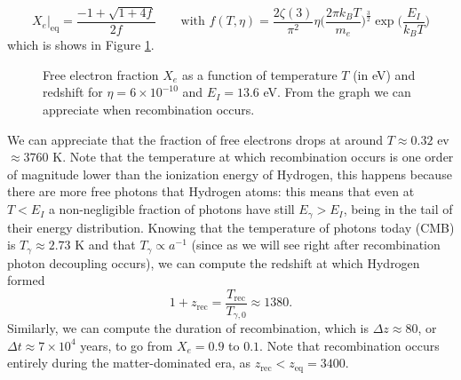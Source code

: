 $$
X_e\bigg|_\text{eq}=\frac{-1+\sqrt{1+4f}}{2f}\qquad \text{with }f(T,\eta)=\frac{2\zeta(3)}{\pi^2}\eta\bigg(\frac{2\pi k_BT}{m_e}\bigg)^{\frac{3}{2}}\exp\bigg({\frac{E_I}{k_BT}}\Bigg)
$$
which is shows in Figure \ref{fig:saha}.
\begin{figure}[ht!]
\centering
{}
\caption{Free electron fraction $X_e$ as a function of temperature $T$ (in eV) and redshift for $\eta=6\times10^{-10}$ and $E_I=13.6$ eV. From the graph we can appreciate when recombination occurs.}
\label{fig:saha}
\end{figure}
We can appreciate that the fraction of free electrons drops at around $T\approx 0.32$ ev $\approx3760$ K. 
Note that the temperature at which recombination occurs is one order of magnitude lower than the ionization energy of Hydrogen, this happens because there are more free photons that Hydrogen atoms: this means that even at $T<E_I$ a non-negligible fraction of photons have still $E_\gamma>E_I$, being in the tail of their energy distribution.
Knowing that the temperature of photons today (CMB) is $T_\gamma\approx2.73$ K and that $T_\gamma\propto a^{-1}$ (since as we will see right after recombination photon decoupling occurs), we can compute the redshift at which Hydrogen formed
$$
1+z_\text{rec}=\frac{T_\text{rec}}{T_{\gamma,0}}\approx 1380.
$$
Similarly, we can compute the duration of recombination, which is $\Delta z\approx 80$, or $\Delta t\approx 7\times 10^{4}$ years, to go from $X_e=0.9$ to $0.1$. Note that recombination occurs entirely during the matter-dominated era, as $z_\text{rec}<z_\text{eq}=3400$.

